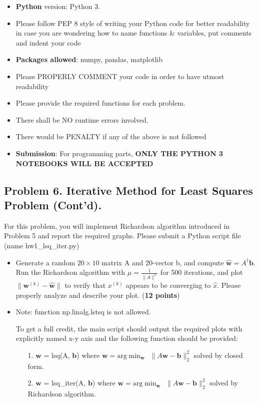 \documentclass[11pt]{scrartcl}
\newcommand{\bw}{\mathbf{w}}
\newcommand{\bb}{\mathbf{b}}
\begin{document}
	\begin{itemize}
		\item \textbf{Python} version: Python 3.
		\item Please follow PEP 8 style of writing your Python code for better readability in case you are wondering how to name functions \& variables, put comments and indent your code
		
		\item \textbf{Packages allowed}: numpy, pandas, matplotlib
		
		\item Please PROPERLY COMMENT your code in order to have utmost readability 
		
		\item Please provide the required functions for each problem.
		
		\item There shall be NO runtime errors involved.
		
		\item There would be PENALTY if any of the above is not followed
		
		\item \textbf{Submission}: For programming parts, \textbf{ONLY THE PYTHON 3 NOTEBOOKS WILL BE ACCEPTED}
	\end{itemize}
	
	\subsection*{Problem 6. Iterative Method for Least Squares Problem (Cont'd).}
	For this problem, you will implement Richardson algorithm introduced in Problem 5 and report the required graphs. Please submit a Python script file (name hw1\_lsq\_iter.py)
	
	\begin{itemize}
		\item Generate a random $20 \times 10$ matrix A and 20-vector b, and compute $\hat{\bw} = A^\dagger \bb$. Run the Richardson algorithm with $\mu = \frac{1}{\|A\|^2}$ for 500 iterations, and plot $\|\bw^{(k)} - \hat{\bw}\|$ to verify that $x^{(k)}$ appears to be converging to $\hat{x}$. Please properly analyze and describe your plot. (\textbf{12 points})
		
		\item Note: function np.linalg.lstsq is not allowed.
		
		To get a full credit, the main script should output the required plots with explicitly named x-y axis and the following function should be provided:
		\begin{itemize}
			\item [1.] $\bw$ = lsq(A, $\bb$) where $\bw = \text{arg}\min_{\bw} \hspace{5pt} \|A \bw - \bb\|_2^2$ solved by closed form.
			\item[2.] $\bw$ = lsq\_iter(A, $\bb$) where $\bw = \text{arg}\min_{\bw} \hspace{5pt} \|A \bw - \bb\|_2^2$ solved by Richardson algorithm.
		\end{itemize}
	\end{itemize}
	
\end{document}

